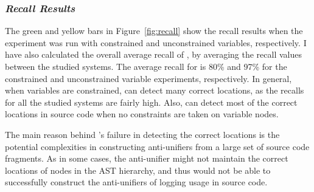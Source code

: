 \subsubsection{\emph{Recall Results}}  \label{recall-results}
The green and yellow bars in Figure~\ref{fig:recall}  show the recall results when the experiment was run with constrained and unconstrained variables, respectively. I have also calculated the overall average recall of , by averaging the recall values between the studied systems. The average recall for  is 80\% and 97\% for the constrained and unconstrained variable experiments, respectively. In general, when variables are constrained,  can detect many correct locations, as the recalls for all the studied systems are fairly high. Also,  can detect most of the correct locations in source code when no constraints are taken on variable nodes.

The main reason behind 's failure in detecting the correct locations is the potential complexities in constructing anti-unifiers from a large set of source code fragments. As in some cases, the anti-unifier might not maintain the correct locations of nodes in the AST hierarchy, and thus  would not be able to successfully construct the anti-unifiers of logging usage in source code.




